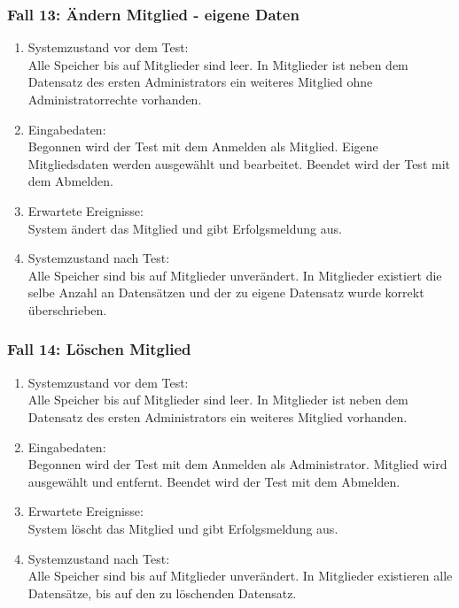 \subsubsection{Fall 13: Ändern Mitglied - eigene Daten}
\begin{enumerate}
\item Systemzustand vor dem Test:\\
	Alle Speicher bis auf Mitglieder sind leer. In Mitglieder ist neben dem Datensatz des ersten Administrators ein weiteres Mitglied ohne Administratorrechte vorhanden.
\item Eingabedaten:\\
	Begonnen wird der Test mit dem Anmelden als Mitglied. Eigene Mitgliedsdaten werden ausgewählt und bearbeitet. Beendet wird der Test mit dem Abmelden.
\item Erwartete Ereignisse:\\
	System ändert das Mitglied und gibt Erfolgsmeldung aus.
\item Systemzustand nach Test:\\
	Alle Speicher sind bis auf Mitglieder unverändert. In Mitglieder existiert die selbe Anzahl an Datensätzen und der zu eigene Datensatz wurde korrekt überschrieben.
\end{enumerate}

\subsubsection{Fall 14: Löschen Mitglied}
\begin{enumerate}
\item Systemzustand vor dem Test:\\
	Alle Speicher bis auf Mitglieder sind leer. In Mitglieder ist neben dem Datensatz des ersten Administrators ein weiteres Mitglied vorhanden.
\item Eingabedaten:\\
	Begonnen wird der Test mit dem Anmelden als Administrator. Mitglied wird ausgewählt und entfernt. Beendet wird der Test mit dem Abmelden.
\item Erwartete Ereignisse:\\
	System löscht das Mitglied und gibt Erfolgsmeldung aus.
\item Systemzustand nach Test:\\
	Alle Speicher sind bis auf Mitglieder unverändert. In Mitglieder existieren alle Datensätze, bis auf den zu löschenden Datensatz.
\end{enumerate}

